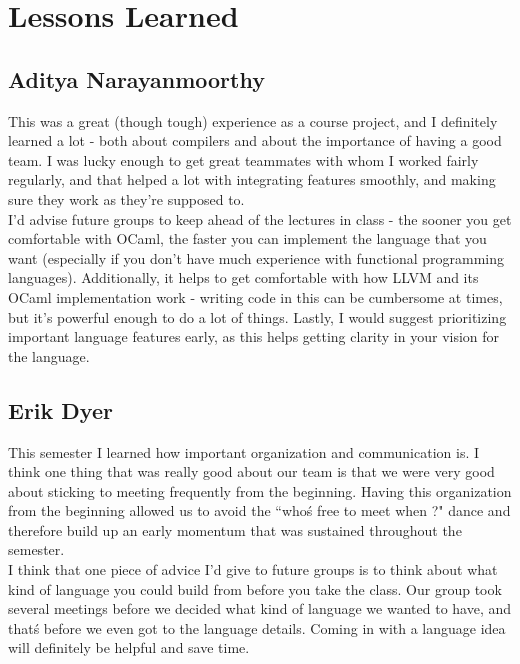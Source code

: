 \documentclass[letterpaper,12pt]{report}
\begin{document}
\chapter{Lessons Learned}
  
  \section{Aditya Narayanmoorthy}
	This was a great (though tough) experience as a course project, and I definitely learned a lot - both about compilers and about the importance of having a good team. I was lucky enough to get great teammates with whom I worked fairly regularly, and that helped a lot with integrating features smoothly, and making sure they work as they're supposed to.\\

    I'd advise future groups to keep ahead of the lectures in class - the sooner you get comfortable with OCaml, the faster you can implement the language that you want (especially if you don't have much experience with functional programming languages). Additionally, it helps to get comfortable with how LLVM and its OCaml implementation work - writing code in this can be cumbersome at times, but it's powerful enough to do a lot of things. Lastly, I would suggest prioritizing important language features early, as this helps getting clarity in your vision for the language.

  \section{Erik Dyer}
    This semester I learned how important organization and communication is. I think one thing that was really good about our team is that we were very good about sticking to meeting frequently from the beginning. Having this organization from the beginning allowed us to avoid the ``who\'s free to meet when ?" dance and therefore build up an early momentum that was sustained throughout the semester.\\

    I think that one piece of advice I'd give to future groups is to think about what kind of language you could build from before you take the class. Our group took several meetings before we decided what kind of language we wanted to have, and that\'s before we even got to the language details. Coming in with a language idea will definitely be helpful and save time.
\end{document}
